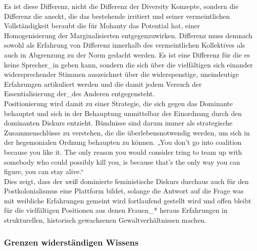 \noindent Es ist diese Differenz, nicht die Differenz der Diversity Konzepte, sondern die
Differenz die aneckt, die das bestehende irritiert und seiner vermeintlichen
Vollständigkeit beraubt die für Mohanty das Potential hat, einer
Homogenisierung der Marginalisierten entgegenzuwirken. Differenz muss demnach
sowohl als Erfahrung von Differenz innerhalb des vermeintlichen Kollektives als
auch in Abgrenzung zu der Norm gedacht werden. Es ist eine Differenz für die es
keine Sprecher\_in geben kann, sondern die sich über die vielfältigen sich
einander widersprechender Stimmen\footnotemark {} auszeichnet über die widerspenstige,
uneindeutige Erfahrungen artikuliert werden und die damit jedem Versuch der
Essentialisierung der\_des Anderen entgegensteht. \\
Positionierung wird damit zu
einer Strategie, die sich gegen das Dominante behauptet und sich in der
Behauptung unmittelbar der Einordnung durch den dominanten Diskurs entzieht.
Bündnisse sind darum immer als strategische Zusammenschlüsse zu verstehen, die
die überlebensnotwendig werden, um sich in der hegemonialen Ordnung behaupten
zu können. „You don't go into coalition because you like it. The only reason
you would consider tring to team up with somebody who could possibly kill you,
is because that's the only way you can figure, you can stay alive.“
\footnotemark {}\\

\noindent Dies zeigt, dass der \textit{w}eiß dominierte feministische Diskurs durchaus auch für
den Postkolonialismus eine Plattform bildet, solange die Antwort auf die Frage
was mit weibliche Erfahrungen gemeint wird fortlaufend gestellt wird und offen
bleibt für die vielfältigen Positionen aus denen Frauen\_* heraus Erfahrungen
in strukturellen, historisch gewachsenen Gewaltverhältnissen machen.

\subsubsection{Grenzen widerständigen Wissens}

